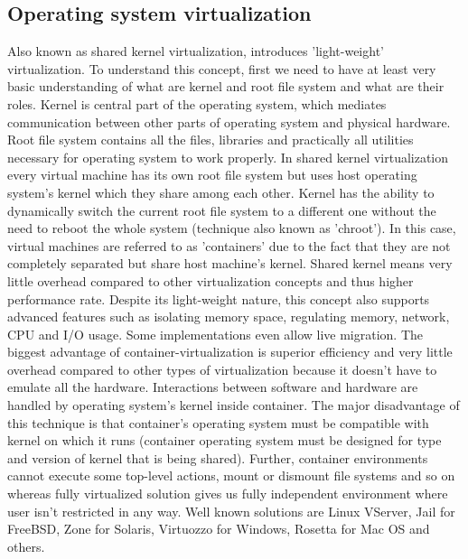 \subsection{Operating system virtualization} 
\label{os_virt}
Also known as shared kernel virtualization, introduces 'light-weight' virtualization. To understand this concept, first we need to have at least very basic understanding of what are kernel and root file system and what are their roles. Kernel is central part of the operating system, which mediates communication between other parts of operating system and physical hardware. Root file system contains all the files, libraries and practically all utilities necessary for operating system to work properly. In shared kernel virtualization every virtual machine has its own root file system but uses host operating system's kernel which they share among each other. Kernel has the ability to dynamically switch the current root file system to a different one without the need to reboot the whole system (technique also known as 'chroot'). In this case, virtual machines are referred to as 'containers' due to the fact that they are not completely separated but share host machine's kernel. Shared kernel means very little overhead compared to other virtualization concepts and thus higher performance rate. Despite its light-weight nature, this concept also supports advanced features such as isolating memory space, regulating memory, network, CPU and I/O usage. Some implementations even allow live migration. The biggest advantage of container-virtualization is superior efficiency and very little overhead compared to other types of virtualization because it doesn't have to emulate all the hardware. Interactions between software and hardware are handled by operating system's kernel inside container. The major disadvantage of this technique is that container's operating system must be compatible with kernel on which it runs (container operating system must be designed for type and version of kernel that is being shared). Further, container environments cannot execute some top-level actions, mount or dismount file systems and so on whereas fully virtualized solution gives us fully independent environment where user isn't restricted in any way.
Well known solutions are Linux VServer, Jail for FreeBSD, Zone for Solaris, Virtuozzo for Windows, Rosetta for Mac OS and others.

